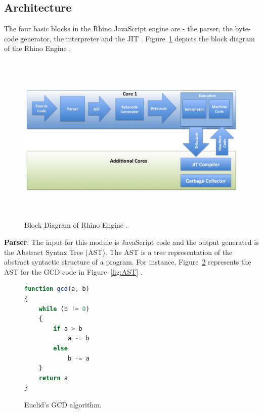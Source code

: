 \subsection{Architecture}
The four basic blocks in the Rhino JavaScript engine are - the parser, the byte-code generator, the interpreter and the JIT \cite{bib4}. Figure~\ref{fig:architecture} depicts the block diagram of the Rhino Engine \cite{bib29}.

\begin{figure}
  \centering
      \includegraphics[width=15cm, height=8.25cm]{rhino.jpg}
    \caption[Block Diagram of Rhino Engine]{Block Diagram of Rhino Engine \cite{bib29}.}
    \label{fig:architecture}
\end{figure}

\textbf{Parser}: The input for this module is JavaScript code and the output generated is the Abstract Syntax Tree (AST). The AST is a tree representation of the abstract syntactic structure of a program. For instance, Figure~\ref{fig:ASTcode} represents the AST for the GCD code in Figure~\ref{fig:AST} \cite{bib30}.

\begin{figure}
  \centering
\begin{lstlisting}[language=JavaScript] 
function gcd(a, b)
{
	while (b != 0)
    {
    	if a > b
        	a -= b
        else
        	b -= a
    }
    return a
}
\end{lstlisting}
    \caption[Euclid's GCD algorithm]{Euclid's GCD algorithm.}
    \label{fig:ASTcode}
\end{figure}

